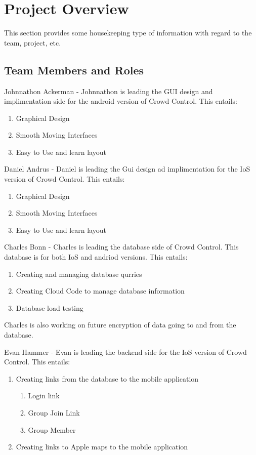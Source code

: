 

\chapter{Project Overview}
This section provides some housekeeping type of information with regard to the 
team, project, etc. 



\section{Team Members and Roles}
Johnnathon Ackerman - Johnnathon is leading the GUI design and implimentation side for the android version of Crowd Control. This entails: 
	\begin {enumerate}
	\item Graphical Design
	\item Smooth Moving Interfaces
	\item Easy to Use and learn layout
	\end{enumerate}

Daniel Andrus - Daniel is leading the Gui design ad implimentation for the IoS version of Crowd Control. This entails:
	\begin {enumerate}
	\item Graphical Design
	\item Smooth Moving Interfaces
	\item Easy to Use and learn layout
	\end{enumerate}

Charles Bonn - Charles is leading the database side of Crowd Control. This database is for both IoS and andriod versions. This entails:
	\begin{enumerate}
	\item Creating and managing database qurries 
	\item Creating Cloud Code to manage database information
	\item Database load testing
	\end{enumerate}
Charles is also working on future encryption of data going to and from the database.
\newline

Evan Hammer - Evan is leading the backend side for the IoS version of Crowd Control. This entails:
	\begin{enumerate}
	\item Creating links from the database to the mobile application
		\begin{enumerate}
		\item Login link
		\item Group Join Link
		\item Group Member
		\end{enumerate}
	\item Creating links to Apple maps to the mobile application
	\end{enumerate}


